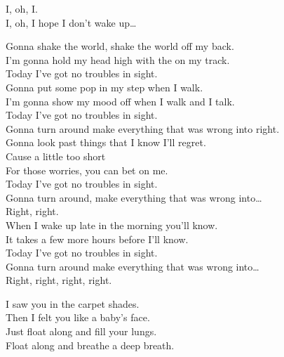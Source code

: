 I, oh, I. \\
I, oh, I hope I don't wake up… \\





Gonna shake the world, shake the world off my back. \\
I'm gonna hold my head high with the  on my track. \\
Today I've got no troubles in sight. \\

Gonna put some pop in my step when I walk. \\
I'm gonna show my mood off when I walk and I talk. \\
Today I've got no troubles in sight. \\
Gonna turn around make everything that was wrong into right. \\

Gonna look past things that I know I'll regret. \\
Cause  a little too short \\
For those worries, you can bet on me. \\
Today I've got no troubles in sight. \\
Gonna turn around, make everything that was wrong into… \\
Right, right. \\

When I wake up late in the morning you'll know. \\
It takes a few more hours before I'll know. \\
Today I've got no troubles in sight. \\
Gonna turn around make everything that was wrong into… \\
Right, right, right, right. \\





I saw you in the carpet shades. \\
Then I felt you like a baby's face. \\
Just float along and fill your lungs. \\
Float along and breathe a deep breath. \\

